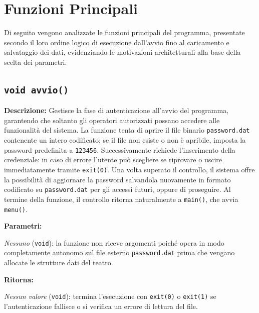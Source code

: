 \documentclass[11pt,a4paper,oneside,openany]{book}
\newenvironment{listacomp}{%
    \small
    \begin{list}{\textendash}{%
        \setlength{\topsep}{2pt}%
        \setlength{\partopsep}{0pt}%
        \setlength{\itemsep}{1pt}%
        \setlength{\parsep}{0pt}%
        \setlength{\leftmargin}{1.2em}%
    }%
}{%
    \end{list}%
}
\begin{document}
\section{Funzioni Principali}

Di seguito vengono analizzate le funzioni principali del programma, presentate secondo il loro ordine logico di esecuzione dall'avvio fino al caricamento e salvataggio dei dati, evidenziando le motivazioni architetturali alla base della scelta dei parametri.

\subsection[avvio()]{\texttt{void avvio()}}\label{sec:avvio}

\noindent\textbf{Descrizione:}
Gestisce la fase di autenticazione all'avvio del programma, garantendo che soltanto gli operatori autorizzati possano accedere alle funzionalità del sistema. La funzione tenta di aprire il file binario \texttt{password.dat} contenente un intero codificato; se il file non esiste o non è apribile, imposta la password predefinita a \texttt{123456}. Successivamente richiede l'inserimento della credenziale: in caso di errore l'utente può scegliere se riprovare o uscire immediatamente tramite \texttt{exit(0)}. Una volta superato il controllo, il sistema offre la possibilità di aggiornare la password salvandola nuovamente in formato codificato su \texttt{password.dat} per gli accessi futuri, oppure di proseguire. Al termine della funzione, il controllo ritorna naturalmente a \texttt{main()}, che avvia \texttt{menu()}.

\noindent\textbf{Parametri:}
\begin{listacomp}
    \item \textit{Nessuno} (\texttt{void}): la funzione non riceve argomenti poiché opera in modo completamente autonomo sul file esterno \texttt{password.dat} prima che vengano allocate le strutture dati del teatro.
\end{listacomp}

\noindent\textbf{Ritorna:}
\begin{listacomp}
    \item \textit{Nessun valore} (\texttt{void}): termina l'esecuzione con \texttt{exit(0)} o \texttt{exit(1)} se l'autenticazione fallisce o si verifica un errore di lettura del file.
\end{listacomp}
\end{document}
